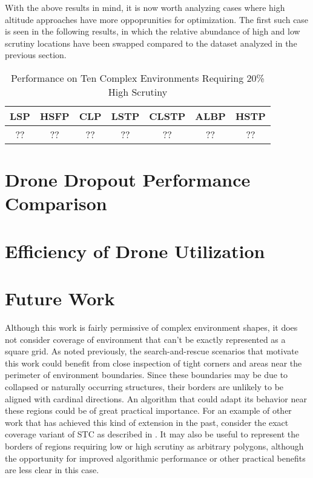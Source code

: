With the above results in mind, it is now worth analyzing cases where high altitude approaches have more oppoprunities for optimization. The first such case is seen in the following results, in which the relative abundance of high and low scrutiny locations have been swapped compared to the dataset analyzed in the previous section.

\begin{table}[h]
\begin{center}
 \begin{tabular}{||c c c c c c c ||}
 \hline
 LSP   & HSFP  & CLP  & LSTP  & CLSTP & ALBP & HSTP \\
 \hline
 ?? & ?? & ?? & ?? & ??  & ?? & ?? \\
 \hline
 \end{tabular}
\end{center}
\caption{Performance on Ten Complex Environments Requiring 20\% High Scrutiny}
\end{table}

\section{Drone Dropout Performance Comparison}

\section{Efficiency of Drone Utilization}


\section{Future Work}

Although this work is fairly permissive of complex environment shapes, it does not consider coverage of environment that can't be exactly represented as a square grid. As noted previously, the search-and-rescue scenarios that motivate this work could benefit from close inspection of tight corners and areas near the perimeter of environment boundaries. Since these boundaries may be due to collapsed or naturally occurring structures, their borders are unlikely to be aligned with cardinal directions. An algorithm that could adapt its behavior near these regions could be of great practical importance. For an example of other work that has achieved this kind of extension in the past, consider the exact coverage variant of STC as described in \cite{STC}. It may also be useful to represent the borders of regions requiring low or high scrutiny as arbitrary polygons, although the opportunity for improved algorithmic performance or other practical benefits are less clear in this case.

